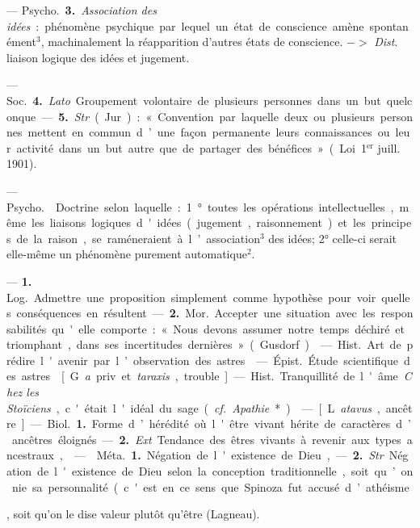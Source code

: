 \begin{itemize}[leftmargin=1cm, label=, itemsep=1pt]
{{{{— \si{Psycho.} {\bf 3.} {\it Association des
idées} : phénomène psychique par
lequel un état de conscience amène
spontanément$^3$, machinalement la
réapparition d’autres états de conscience. $->$ {\it Dist}. liaison logique
des idées et jugement.

— \si{Soc.} {\bf 4.} {\it Lato}. Groupement
volontaire de plusieurs personnes
dans un but quelconque. — {\bf 5.} {\it Str}.
(Jur.) : « Convention par laquelle
deux ou plusieurs personnes mettent
en commun d’une façon permanente
leurs connaissances ou leur activité
dans un but autre que de partager
des bénéfices ». (Loi 1$^\text{er}$ juill. 1901).

 — \si{Psycho.}  Doctrine selon laquelle : 1° toutes les
opérations intellectuelles, même les
liaisons logiques d'idées (jugement,
raisonnement) et les principes de la
raison, se raméneraient à l’association$^3$ des idées; 2° celle-ci serait
elle-même un phénomène purement
automatique$^2$.

 — {\bf 1.} \si{Log.} Admettre une
proposition simplement comme hypothèse pour voir quelles
conséquences en résultent.

— {\bf 2.} \si{Mor.} Accepter une situation avec les responsabilités qu'elle
comporte : « Nous devons assumer
notre temps déchiré et triomphant,
dans ses incertitudes dernières »
(Gusdorf).

 — \si{Hist.} Art de prédire
l'avenir par l’observation des astres.

 — \si{Épist.} Étude scientifique des astres.

 [G. {\it a} priv. et {\it taraxis}, trouble]. — \si{Hist.} Tranquillité de l'âme.
{\it Chez les Stoïciens}, c'était l'idéal du
sage ({\it cf.}  {\it Apathie}*).

 — [L. {\it atavus}, ancêtre] —
\si{Biol.} {\bf 1.} Forme d’hérédité où l'être
vivant hérite de caractères d’ancêtres éloignés. — {\bf 2.} {\it Ext}. Tendance
des êtres vivants à revenir aux types
ancestraux,

 —  \si{Méta.} {\bf 1.} Négation de
l'existence de Dieu, — {\bf 2.} {\it Str}. Négation de l'existence de Dieu selon la
conception traditionnelle, soit qu’on
nie sa personnalité (c'est en ce sens
que Spinoza fut accusé d’athéisme},
soit qu’on le dise valeur plutôt
qu'être (Lagneau).

}}}
\end{itemize}
